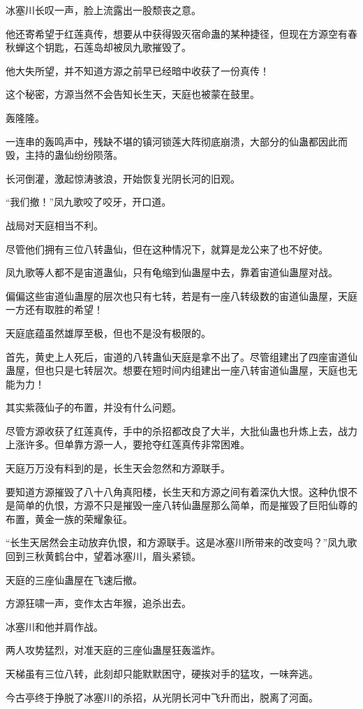 \begin{this_body}
冰塞川长叹一声，脸上流露出一股颓丧之意。

他还寄希望于红莲真传，想要从中获得毁灭宿命蛊的某种捷径，但现在方源空有春秋蝉这个钥匙，石莲岛却被凤九歌摧毁了。

他大失所望，并不知道方源之前早已经暗中收获了一份真传！

这个秘密，方源当然不会告知长生天，天庭也被蒙在鼓里。

轰隆隆。

一连串的轰鸣声中，残缺不堪的镇河锁莲大阵彻底崩溃，大部分的仙蛊都因此而毁，主持的蛊仙纷纷陨落。

长河倒灌，激起惊涛骇浪，开始恢复光阴长河的旧观。

“我们撤！”凤九歌咬了咬牙，开口道。

战局对天庭相当不利。

尽管他们拥有三位八转蛊仙，但在这种情况下，就算是龙公来了也不好使。

凤九歌等人都不是宙道蛊仙，只有龟缩到仙蛊屋中去，靠着宙道仙蛊屋对战。

偏偏这些宙道仙蛊屋的层次也只有七转，若是有一座八转级数的宙道仙蛊屋，天庭一方还有取胜的希望！

天庭底蕴虽然雄厚至极，但也不是没有极限的。

首先，黄史上人死后，宙道的八转蛊仙天庭是拿不出了。尽管组建出了四座宙道仙蛊屋，但也只是七转层次。想要在短时间内组建出一座八转宙道仙蛊屋，天庭也无能为力！

其实紫薇仙子的布置，并没有什么问题。

尽管方源收获了红莲真传，手中的杀招都改良了大半，大批仙蛊也升炼上去，战力上涨许多。但单靠方源一人，要抢夺红莲真传非常困难。

天庭万万没有料到的是，长生天会忽然和方源联手。

要知道方源摧毁了八十八角真阳楼，长生天和方源之间有着深仇大恨。这种仇恨不是简单的仇恨，方源不只是摧毁一座八转仙蛊屋那么简单，而是摧毁了巨阳仙尊的布置，黄金一族的荣耀象征。

“长生天居然会主动放弃仇恨，和方源联手。这是冰塞川所带来的改变吗？”凤九歌回到三秋黄鹤台中，望着冰塞川，眉头紧锁。

天庭的三座仙蛊屋在飞速后撤。

方源狂啸一声，变作太古年猴，追杀出去。

冰塞川和他并肩作战。

两人攻势猛烈，对准天庭的三座仙蛊屋狂轰滥炸。

天梯虽有三位八转，此刻却只能默默困守，硬挨对手的猛攻，一味奔逃。

今古亭终于挣脱了冰塞川的杀招，从光阴长河中飞升而出，脱离了河面。


\end{this_body}
